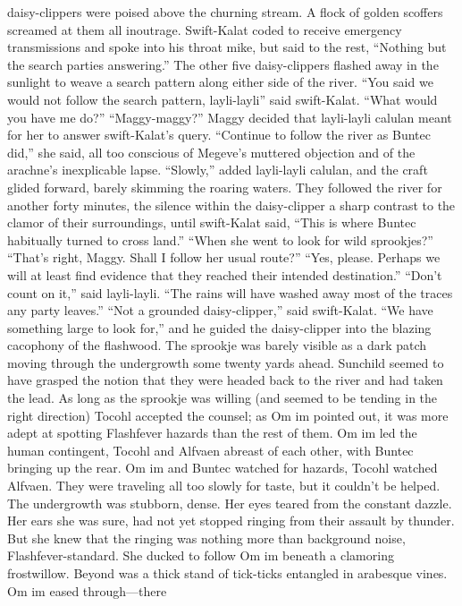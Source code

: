 \documentclass[9pt]{article}
\begin{document}
daisy-clippers were poised above the churning stream. A flock of golden scoffers screamed at them all inoutrage.
Swift-Kalat coded to receive emergency transmissions and spoke into his throat mike, but said to the
rest, “Nothing but the search parties answering.” The other five daisy-clippers flashed away in the sunlight
to weave a search pattern along either side of the river.
“You said we would not follow the search pattern, layli-layli” said swift-Kalat. “What would you
have me do?”
“Maggy-maggy?”
Maggy decided that layli-layli calulan meant for her to answer swift-Kalat’s query. “Continue to
follow the river as Buntec did,” she said, all too conscious of Megeve’s muttered objection and of the
arachne’s inexplicable lapse.
“Slowly,” added layli-layli calulan, and the craft glided forward, barely skimming the roaring
waters.
They followed the river for another forty minutes, the silence within the daisy-clipper a sharp contrast
to the clamor of their surroundings, until swift-Kalat said, “This is where Buntec habitually turned to cross
land.”
“When she went to look for wild sprookjes?”
“That’s right, Maggy. Shall I follow her usual route?”
“Yes, please. Perhaps we will at least find evidence that they reached their intended destination.”
“Don’t count on it,” said layli-layli. “The rains will have washed away most of the traces any party
leaves.”
“Not a grounded daisy-clipper,” said swift-Kalat. “We have something large to look for,” and he
guided the daisy-clipper into the blazing cacophony of the flashwood.
The sprookje was barely visible as a dark patch moving through the undergrowth some twenty yards
ahead. Sunchild seemed to have grasped the notion that they were headed back to the river and had
taken the lead. As long as the sprookje was willing (and seemed to be tending in the right direction)
Tocohl accepted the counsel; as Om im pointed out, it was more adept at spotting Flashfever hazards
than the rest of them.
Om im led the human contingent, Tocohl and Alfvaen abreast of each other, with Buntec bringing up
the rear. Om im and Buntec watched for hazards, Tocohl watched Alfvaen. They were traveling all too
slowly for taste, but it couldn’t be helped. The undergrowth was stubborn, dense.
Her eyes teared from the constant dazzle. Her ears she was sure, had not yet stopped ringing from
their assault by thunder. But she knew that the ringing was nothing more than background noise,
Flashfever-standard. She ducked to follow Om im beneath a clamoring frostwillow.
Beyond was a thick stand of tick-ticks entangled in arabesque vines. Om im eased through—there
\end{document}
